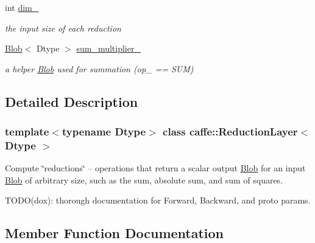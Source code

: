 \begin{DoxyCompactItemize}
int \mbox{\hyperlink{classcaffe_1_1_reduction_layer_a5d0cdd8ca00e6bbd425a51bef2214a7e}{dim\+\_\+}}
\begin{DoxyCompactList}\small\item\em the input size of each reduction \end{DoxyCompactList}\item 
\mbox{\label{classcaffe_1_1_reduction_layer_aaba23d98bb1d7b9aad5ec3f4d4195d82}} 
\mbox{\hyperlink{classcaffe_1_1_blob}{Blob}}$<$ Dtype $>$ \mbox{\hyperlink{classcaffe_1_1_reduction_layer_aaba23d98bb1d7b9aad5ec3f4d4195d82}{sum\+\_\+multiplier\+\_\+}}
\begin{DoxyCompactList}\small\item\em a helper \mbox{\hyperlink{classcaffe_1_1_blob}{Blob}} used for summation (op\+\_\+ == S\+UM) \end{DoxyCompactList}\end{DoxyCompactItemize}


\subsection{Detailed Description}
\subsubsection*{template$<$typename Dtype$>$\newline
class caffe\+::\+Reduction\+Layer$<$ Dtype $>$}

Compute \char`\"{}reductions\char`\"{} -- operations that return a scalar output \mbox{\hyperlink{classcaffe_1_1_blob}{Blob}} for an input \mbox{\hyperlink{classcaffe_1_1_blob}{Blob}} of arbitrary size, such as the sum, absolute sum, and sum of squares. 

T\+O\+D\+O(dox)\+: thorough documentation for Forward, Backward, and proto params. 

\subsection{Member Function Documentation}
\mbox{\label{classcaffe_1_1_reduction_layer_a64694af2e56723590072cac88bf825c7}} 
